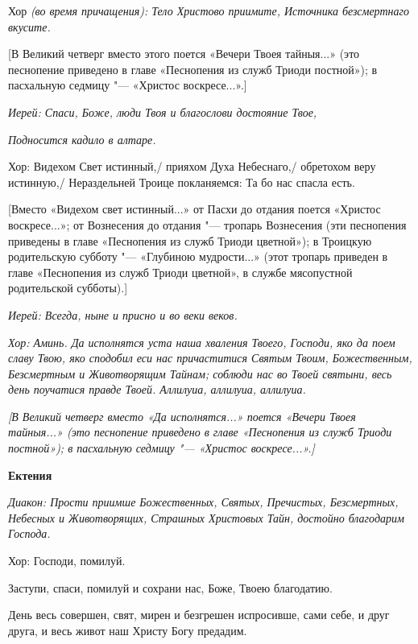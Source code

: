 Хор \itshape (во время причащения)\normalfont{}: Тело Христово приимите, Источника безсмертнаго вкусите.


 [В Великий четверг вместо этого поется «Вечери Твоея тайныя...» (это песнопение приведено в главе «Песнопения из служб Триоди постной»); в пасхальную седмицу "--- «Христос воскресе...».]


 \itshape Иерей:\normalfont{} Спаси, Боже, люди Твоя и благослови достояние Твое, 


\itshape Подносится кадило в алтаре.\normalfont{} 


      Хор: Видехом Свет истинный,/ прияхом Духа Небеснаго,/ обретохом веру истинную,/ Нераздельней Троице покланяемся: Та бо нас спасла есть.


      [Вместо «Видехом свет истинный...» от Пасхи до отдания поется «Христос воскресе...»; от Вознесения до отдания "--- тропарь Вознесения (эти песнопения приведены в главе «Песнопения из служб Триоди цветной»); в Троицкую родительскую субботу "--- «Глубиною мудрости...» (этот тропарь приведен в главе «Песнопения из служб Триоди цветной», в службе мясопустной родительской субботы).]


\itshape  Иерей:\normalfont{} Всегда, ныне и присно и во веки веков.


\itshape  Хор:\normalfont{} Аминь. Да исполнятся уста наша хваления Твоего, Господи, яко да поем славу Твою, яко сподобил еси нас причаститися Святым Твоим, Божественным, Безсмертным и Животворящим Тайнам; соблюди нас во Твоей святыни, весь день поучатися правде Твоей. Аллилуиа, аллилуиа, аллилуиа. 


\itshape [В Великий четверг вмест\normalfont{}о «Да исполнятся...» поется «Вечери Твоея тайныя...» (это песнопение приведено в главе «Песнопения из служб Триоди постной»); в пасхальную седмицу "--- «Христос воскресе...».]


\medskip\bfseries Ектения \normalfont{}\nopagebreak


\itshape  Диакон:\normalfont{} Прости приимше Божественных, Святых, Пречистых, Безсмертных, Небесных и Животворящих, Страшных Христовых Тайн, достойно благодарим Господа. \itshape 


  Хор:\normalfont{} Господи, помилуй. 


  Заступи, спаси, помилуй и сохрани нас, Боже, Твоею благодатию. 


  День весь совершен, свят, мирен и безгрешен испросивше, сами себе, и друг друга, и весь живот наш Христу Богу предадим. \itshape 



